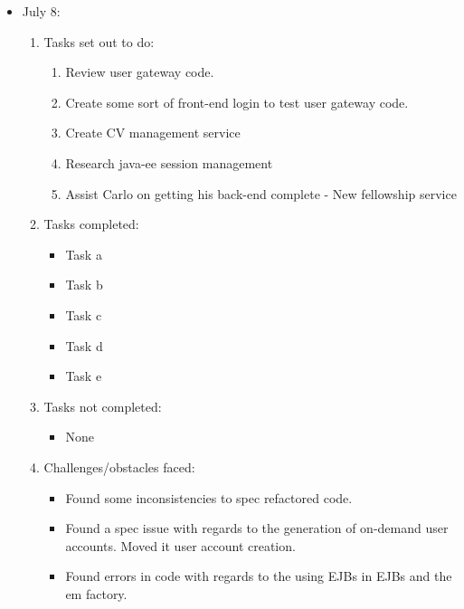	\begin{itemize}
		\item July 8:
		\begin{enumerate}
			\item Tasks set out to do:
			\begin{enumerate}
				\item Review user gateway code.
				\item Create some sort of front-end login to test user gateway code.
				\item Create CV management service 
				\item Research java-ee session management
				\item Assist Carlo on getting his back-end complete - New fellowship service
			\end{enumerate}
			\item Tasks completed:
			\begin{itemize}
				\item Task a
				\item Task b
				\item Task c
				\item Task d
				\item Task e
			\end{itemize}
			\item Tasks not completed:
			\begin{itemize}
				\item None
			\end{itemize}
			\item Challenges/obstacles faced:
			\begin{itemize}
				\item Found some inconsistencies to spec refactored code. 
				\item Found a spec issue with regards to the generation of on-demand user accounts. Moved it user account creation.
				\item Found errors in code with regards to the using EJBs in EJBs and the em factory.
			\end{itemize}			
		\end{enumerate}
	\end{itemize}
	
